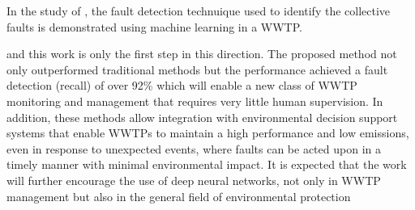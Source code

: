 In the study of \citet{mamandipoorMonitoringDetectingFaults2020}, the fault detection technuique used to identify the collective faults is demonstrated using machine learning in a WWTP. 

and this work is only the first step in this direction. The proposed method not only outperformed traditional methods but the performance achieved a fault detection (recall) of over 92\% which will enable a new class of WWTP monitoring and management that requires very little human supervision. In addition, these methods allow integration with environmental decision support systems that enable WWTPs to maintain a high performance and low emissions, even in response to unexpected events, where faults can be acted upon in a timely manner with minimal environmental impact. It is expected that the work will further encourage the use of deep neural networks, not only in WWTP management but also in the general field of environmental protection


